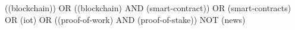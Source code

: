 ((blockchain))
OR ((blockchain) AND (smart-contract))
OR (smart-contracts) OR (iot) OR ((proof-of-work) AND (proof-of-stake)) 
NOT (news)